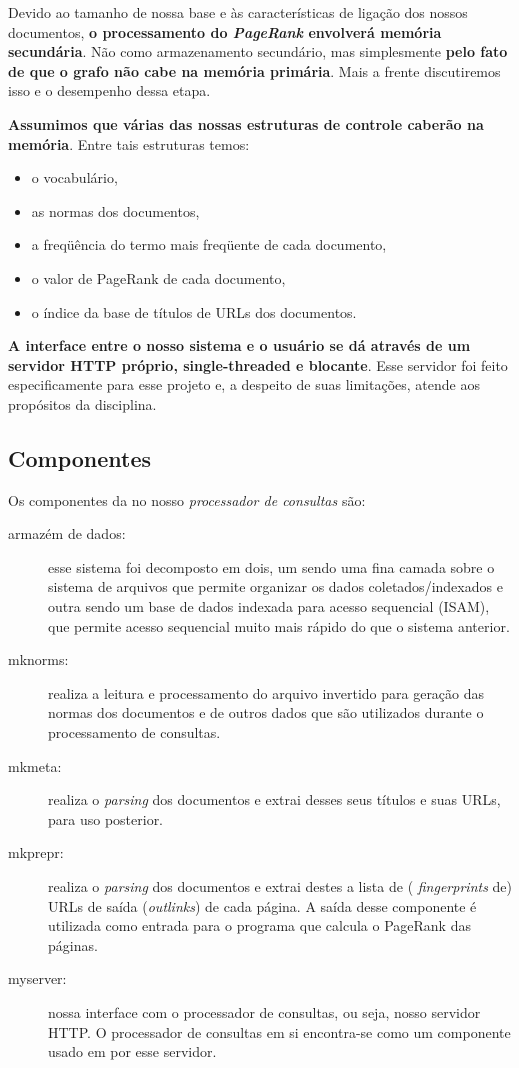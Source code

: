 \documentclass[10pt,twocolumn]{article}
\begin{document}
Devido ao tamanho de nossa base e às características de ligação dos
nossos documentos, \textbf{o processamento do \emph{PageRank} envolverá
memória secundária}. Não como armazenamento secundário, mas simplesmente
\textbf{pelo fato de que o grafo não cabe na memória primária}. Mais a
frente discutiremos isso e o desempenho dessa etapa.

\textbf{Assumimos que várias das nossas estruturas de controle caberão na
memória}. Entre tais estruturas temos:
\begin{itemize}
\item o vocabulário,
\item as normas dos documentos,
\item a freqüência do termo mais freqüente de cada documento,
\item o valor de PageRank de cada documento,
\item o índice da base de títulos de URLs dos documentos.
\end{itemize}

\textbf{A interface entre o nosso sistema e o usuário se dá através de um
servidor HTTP próprio, single-threaded e blocante}. Esse servidor foi
feito especificamente para esse projeto e, a despeito de suas
limitações, atende aos propósitos da disciplina.

\subsection{Componentes}


Os componentes da no nosso \emph{processador de consultas} são:
\begin{description}
\item[armazém de dados:] esse sistema foi decomposto em dois, um sendo 
uma fina camada sobre o sistema de arquivos que
permite organizar os dados coletados/indexados e outra sendo um base de
dados indexada para acesso sequencial (ISAM), que permite acesso
sequencial muito mais rápido do que o sistema anterior.
\item[mknorms:] realiza a leitura e processamento do arquivo invertido
para geração das normas dos documentos e de outros dados que são
utilizados durante o processamento de consultas.
\item[mkmeta:] realiza o \emph{parsing} dos documentos e extrai desses
seus títulos e suas URLs, para uso posterior.
\item[mkprepr:] realiza o \emph{parsing} dos documentos e extrai destes
a lista de ( \emph{fingerprints} de) URLs de saída (\emph{outlinks}) de
cada página. A saída desse componente é utilizada como entrada para o
programa que calcula o PageRank das páginas.
\item[myserver:] nossa interface com o processador de consultas, ou
seja, nosso servidor HTTP. O processador de consultas em si encontra-se
como um componente usado em por esse servidor.
\end{description}
\end{document}
